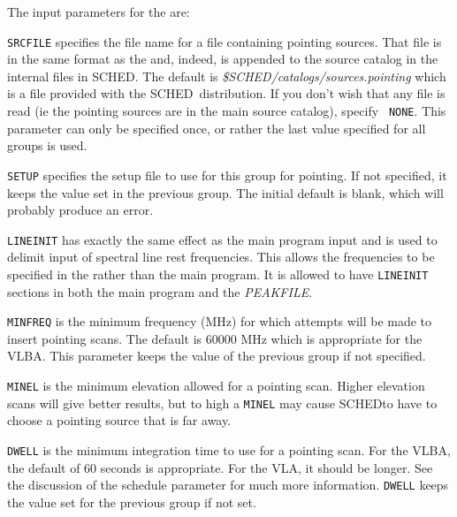 \documentclass{report}
\newcommand{\sched}{{\sc SCHED}}
\newcommand{\schedb}{{\sc SCHED~}}
\begin{document}
The input parameters for the  are:

\begin{list}{}{\parsep 0em  \itemsep 0em }

\item {\tt SRCFILE} specifies the file name for a file containing
pointing sources.  That file is in the same format as the
 and, indeed, is appended to
the source catalog in the internal files in \sched.  The default is
{\sl \$SCHED/catalogs/sources.pointing} which is a file provided with
the \schedb distribution.  If you don't wish that any file is read (ie
the pointing sources are in the main source catalog), specify {\tt
NONE}.  This parameter can only be specified once, or rather the last
value specified for all groups is used.

\item {\tt SETUP} specifies the setup file to use for this group for
pointing.  If not specified, it keeps the value set in the previous
group.  The initial default is blank, which will probably produce an error.

\item {\tt LINEINIT} has exactly the same effect as the main program
input  and is used to delimit
input of spectral line rest frequencies.  This allows the frequencies
to be specified in the  rather
than the main program.  It is allowed to have {\tt LINEINIT} sections
in both the main program and the {\sl PEAKFILE}.

\item {\tt MINFREQ} is the minimum frequency (MHz) for which attempts will
be made to insert pointing scans.  The default is 60000 MHz which is
appropriate for the VLBA.  This parameter keeps the value of the previous
group if not specified.

\item {\tt MINEL} is the minimum elevation allowed for a pointing scan.
Higher elevation scans will give better results, but to high a {\tt MINEL}
may cause \sched to have to choose a pointing source that is far away.

\item {\tt DWELL} is the minimum integration time to use for a pointing
scan.  For the VLBA, the default of 60 seconds is appropriate.  For the
VLA, it should be longer.  See the discussion of the schedule parameter
 for much more information.
{\tt DWELL} keeps the value set for the previous group if not set.


\end{list}
\end{document}
